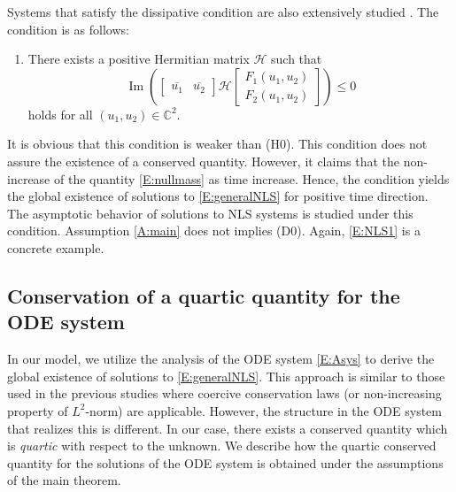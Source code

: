 \documentclass[11pt,a4paper,oneside]{amsart}
\theoremstyle{plain}
\theoremstyle{remark}
\numberwithin{equation}{section}
\newcommand{\C}{\mathbb{C}}
\renewcommand{\Im}{\operatorname{Im}}
\def\({\left(}
\def\){\right)}
\def\le{\leqslant}
\theoremstyle{definition}
\begin{document}
Systems that satisfy the dissipative condition are also extensively studied \cite{HNS,SaSu,LS,LS2,Shimomura,Sa,LNSS1,LNSS2,LNSS5,KiSa,KiSa2}.
The condition is as follows:
\begin{enumerate}
\item[(D0)]
There exists a positive Hermitian matrix $\mathscr{H}$ such that
\[
	\Im \(\begin{bmatrix} 
	\overline{u_1} & \overline{u_2} 
	\end{bmatrix}
	\mathscr{H}
	\begin{bmatrix}
	F_1 (u_1,u_2) \\
	F_2 (u_1,u_2)
	\end{bmatrix}
	\)
	\le 0
\]
holds for all $(u_1,u_2) \in \C^2$.
\end{enumerate}
It is obvious that this condition is weaker than (H0).
This condition does not assure the existence of a conserved quantity.
However, it claims that the non-increase of the quantity \eqref{E:nullmass} as time increase.
Hence, the condition yields the global existence of solutions to \eqref{E:generalNLS}
for positive time direction.
The asymptotic behavior of solutions to NLS systems is studied 
under this condition.
Assumption \ref{A:main} does not implies (D0). Again, 
\eqref{E:NLS1} is a concrete example.



\subsection{Conservation of a quartic quantity for the ODE system}

In our model, we utilize the analysis of the ODE system \eqref{E:Asys} to derive the global existence of solutions to \eqref{E:generalNLS}. This approach is similar to those used in the previous studies where coercive conservation laws (or non-increasing property of $L^2$-norm)
are applicable. 
However, the structure in the ODE system that realizes this is different.
In our case, there exists a conserved quantity which is \emph{quartic} with respect to the unknown.
%
We describe how the quartic conserved quantity for the solutions of the ODE system is obtained under the assumptions of the main theorem.
\end{document}
